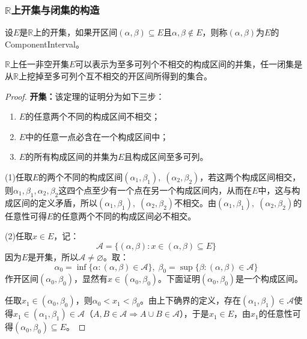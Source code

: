 \subsubsection{$\mathbb{R}$上开集与闭集的构造}
\begin{definition}
	设$E$是$\mathbb{R}$上的开集，如果开区间$(\alpha,\beta)\subseteq E$且$\alpha,\beta\notin E$，则称$(\alpha,\beta)$为$E$的\gls{ComponentInterval}。
\end{definition}
\begin{theorem}\label{theo:ROpenClosedSetComponentInterval}
	$\mathbb{R}$上任一非空开集$E$可以表示为至多可列个不相交的构成区间的并集，任一闭集是从$\mathbb{R}$上挖掉至多可列个互不相交的开区间所得到的集合。
\end{theorem}
\begin{proof}
	\textbf{开集：}该定理的证明分为如下三步：
	\begin{enumerate}
		\item $E$的任意两个不同的构成区间不相交；
		\item $E$中的任意一点必含在一个构成区间中；
		\item $E$的所有构成区间的并集为$E$且构成区间至多可列。
	\end{enumerate}\par
	(1)任取$E$的两个不同的构成区间$(\alpha_1,\beta_1),\;(\alpha_2,\beta_2)$，若这两个构成区间相交，则$\alpha_1,\beta_1,\alpha_2,\beta_2$这四个点至少有一个点在另一个构成区间内，从而在$E$中，这与构成区间的定义矛盾，所以$(\alpha_1,\beta_1),\;(\alpha_2,\beta_2)$不相交。由$(\alpha_1,\beta_1),\;(\alpha_2,\beta_2)$的任意性可得$E$的任意两个不同的构成区间必不相交。\par
	(2)任取$x\in E$，记：
	\begin{equation*}
		\mathscr{A}=\{(\alpha,\beta):x\in(\alpha,\beta)\subseteq E\}
	\end{equation*}
	因为$E$是开集，所以$\mathscr{A}\ne\varnothing$。取：
	\begin{equation*}
		\alpha_0=\inf\{\alpha:(\alpha,\beta)\in \mathscr{A}\},\;
		\beta_0=\sup\{\beta:(\alpha,\beta)\in \mathscr{A}\}
	\end{equation*}
	作开区间$(\alpha_0,\beta_0)$，显然有$x\in(\alpha_0,\beta_0)$。下面证明$(\alpha_0,\beta_0)$是一个构成区间。\par
	任取$x_1\in(\alpha_0,\beta_0)$，则$\alpha_0<x_1<\beta_0$。由上下确界的定义，存在$(\alpha_1,\beta_1)\in\mathscr{A}$使得$x_1\in(\alpha_1,\beta_1)\in\mathscr{A}$（$A,B\in\mathscr{A}\Rightarrow A\cup B\in\mathscr{A}$），于是$x_1\in E$，由$x_1$的任意性可得$(\alpha_0,\beta_0)\subseteq E$。\par

\end{proof}
